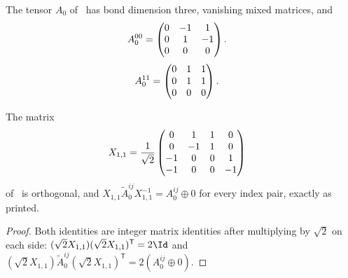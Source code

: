 \begin{definition}
    \label{def:asymex_czy_reduced}
    \leanok
    The tensor $A_0$ of~\cite[Section~II]{Liu2025Bialgebraic} has bond
    dimension three, vanishing mixed matrices, and
    \begin{align}
        A_0^{00} & =\begin{pmatrix}0&-1&1\\0&1&-1\\0&0&0\end{pmatrix}.
        \notag
    \end{align}
    \begin{align}
        A_0^{11} & =\begin{pmatrix}0&1&1\\0&1&1\\0&0&0\end{pmatrix}.
        \notag
    \end{align}
\end{definition}

\begin{lemma}
    \label{thm:asymex_czy_printed_reduction}
    \leanok
    The matrix
    \begin{align}
        X_{1,1} & =\frac{1}{\sqrt2}\begin{pmatrix}
                                       0  & 1  & 1 & 0  \\
                                       0  & -1 & 1 & 0  \\
                                       -1 & 0  & 0 & 1  \\
                                       -1 & 0  & 0 & -1
                                   \end{pmatrix}
        \notag
    \end{align}
    of~\cite[Appendix~B]{Liu2025Bialgebraic} is orthogonal, and
    $X_{1,1}\widetilde A_0^{ij}X_{1,1}^{-1}=A_0^{ij}\oplus0$ for every
    index pair, exactly as printed.
\end{lemma}

\begin{proof}
    \leanok
    Both identities are integer matrix identities after multiplying by
    $\sqrt2$ on each side: $(\sqrt2X_{1,1})(\sqrt2X_{1,1})^{\mathsf T}=2\Id$
    and
    $(\sqrt2X_{1,1})\widetilde A_0^{ij}(\sqrt2X_{1,1})^{\mathsf T}
        =2(A_0^{ij}\oplus0)$.
\end{proof}

